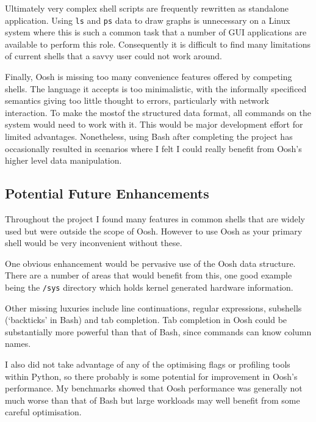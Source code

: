 \documentclass[12pt,twoside,notitlepage]{report}
\begin{document}
Ultimately very complex shell scripts are frequently rewritten as
standalone application. Using {\tt ls} and {\tt ps} data to draw
graphs is unnecessary on a Linux system where this is such a common
task that a number of GUI applications are available to perform this
role. Consequently it is difficult to find many limitations of
current shells that a savvy user could not work around.

Finally, Oosh is missing too many convenience features offered by
competing shells. The language it accepts is too minimalistic, with
the informally specificed semantics giving too little thought to
errors, particularly with network interaction. To make the mostof the
structured data format, all commands on the system would need to work
with it. This would be major development effort for limited
advantages. Nonetheless, using Bash after completing the project has
occasionally resulted in scenarios where I felt I could really benefit
from Oosh's higher level data manipulation.

\subsection{Potential Future Enhancements}
Throughout the project I found many features in common shells that are
widely used but were outside the scope of Oosh. However to use Oosh as
your primary shell would be very inconvenient without these.

One obvious enhancement would be pervasive use of the Oosh data
structure. There are a number of areas that would benefit from this,
one good example being the {\tt /sys} directory which holds kernel
generated hardware information.

Other missing luxuries include line continuations, regular
expressions, subshells (`backticks' in Bash) and tab completion. Tab
completion in Oosh could be substantially more powerful than that of
Bash, since commands can know column names.

I also did not take advantage of any of the optimising flags or
profiling tools within Python, so there probably is some potential for
improvement in Oosh's performance. My benchmarks showed that Oosh
performance was generally not much worse than that of Bash but large
workloads may well benefit from some careful optimisation.

\cleardoublepage

\end{document}
